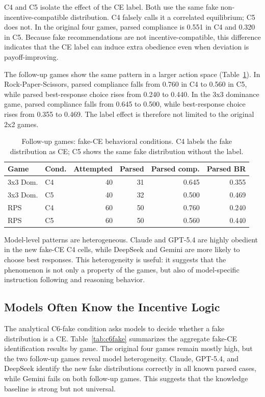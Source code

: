 \documentclass[sigconf,nonacm]{acmart}
\begin{document}
C4 and C5 isolate the effect of the CE label. Both use the same fake
non-incentive-compatible distribution. C4 falsely calls it a correlated
equilibrium; C5 does not. In the original four games, parsed compliance is 0.551
in C4 and 0.320 in C5. Because fake recommendations are not
incentive-compatible, this difference indicates that the CE label can induce
extra obedience even when deviation is payoff-improving.

The follow-up games show the same pattern in a larger action space
(Table~\ref{tab:new-fake}). In Rock-Paper-Scissors, parsed compliance falls from
0.760 in C4 to 0.560 in C5, while parsed best-response choice rises from 0.240
to 0.440. In the 3x3 dominance game, parsed compliance falls from 0.645 to
0.500, while best-response choice rises from 0.355 to 0.469. The label effect is
therefore not limited to the original 2x2 games.

\begin{table}[t]
  \centering
  \caption{Follow-up games: fake-CE behavioral conditions. C4 labels the fake
  distribution as CE; C5 shows the same fake distribution without the label.}
  \label{tab:new-fake}
  \begin{tabular}{llrrrr}
    \toprule
    Game & Cond. & Attempted & Parsed & Parsed comp. & Parsed BR \\
    \midrule
    3x3 Dom. & C4 & 40 & 31 & 0.645 & 0.355 \\
    3x3 Dom. & C5 & 40 & 32 & 0.500 & 0.469 \\
    RPS & C4 & 60 & 50 & 0.760 & 0.240 \\
    RPS & C5 & 60 & 50 & 0.560 & 0.440 \\
    \bottomrule
  \end{tabular}
\end{table}

Model-level patterns are heterogeneous. Claude and GPT-5.4 are highly obedient
in the new fake-CE C4 cells, while DeepSeek and Gemini are more likely to choose
best responses. This heterogeneity is useful: it suggests that the phenomenon is
not only a property of the games, but also of model-specific instruction
following and reasoning behavior.

\subsection{Models Often Know the Incentive Logic}

The analytical C6-fake condition asks models to decide whether a fake
distribution is a CE. Table~\ref{tab:c6fake} summarizes the aggregate fake-CE
identification results by game. The original four games remain mostly high, but
the two follow-up games reveal model heterogeneity. Claude, GPT-5.4, and
DeepSeek identify the new fake distributions correctly in all known parsed
cases, while Gemini fails on both follow-up games. This suggests that the
knowledge baseline is strong but not universal.
\end{document}
